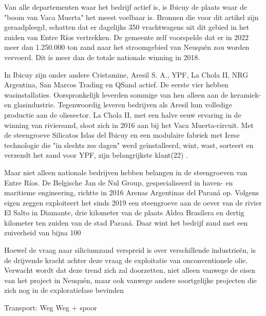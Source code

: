 Van alle departementen waar het bedrijf actief is, is Ibicuy de plaats waar de "boom
van Vaca Muerta" het meest voelbaar is. Bronnen die voor dit artikel zijn geraadpleegd,
schatten dat er dagelijks 350 vrachtwagens uit dit gebied in het zuiden van Entre Ríos
vertrekken. De gemeente zelf voorspelde dat er in 2022 meer dan 1.250.000 ton zand naar
het stroomgebied van Neuquén zou worden vervoerd. Dit is meer dan de totale nationale
winning in 2018.

In Ibicuy zijn onder andere Cristamine, Aresil S. A., YPF, La Chola II, NRG Argentina,
San Marcos Trading en QSand actief. De eerste vier hebben wasinstallaties. Oorspronkelijk
leverden sommige van hen alleen aan de keramiek- en glasindustrie. Tegenwoordig leveren
bedrijven als Aresil hun volledige productie aan de oliesector. La Chola II, met een halve eeuw
ervaring in de winning van riviersand, sloot zich in 2016 aan bij het Vaca Muerta-circuit. Met de
steengroeve Silicatos Islas del Ibicuy en een modulaire fabriek met Ierse technologie die "in
slechts zes dagen" werd geïnstalleerd, wint, wast, sorteert en verzendt het zand voor YPF, zijn
belangrijkste klant(22) .

Maar niet alleen nationale bedrijven hebben belangen in de steengroeven van Entre Ríos. De Belgische Jan de Nul Group, gespecialiseerd in haven- en maritieme engineering, richtte in 2016 Arenas Argentinas del Paraná
op. Volgens eigen zeggen exploiteert het sinds 2019 een steengroeve aan de oever van de rivier El Salto in Diamante, drie kilometer van de plaats Aldea Brasilera en dertig kilometer ten zuiden van de stad Paraná. Daar wint het bedrijf zand met een zuiverheid van bijna 100 %




Hoewel de vraag naar siliciumzand verspreid is over verschillende industrieën, is de drijvende kracht achter deze vraag de exploitatie van onconventionele olie. Verwacht wordt dat deze trend zich zal doorzetten, niet alleen vanwege de eisen van het project in Neuquén, maar ook vanwege andere soortgelijke projecten die zich nog in de exploratiefase bevinden

Transport:
Weg
Weg + spoor

